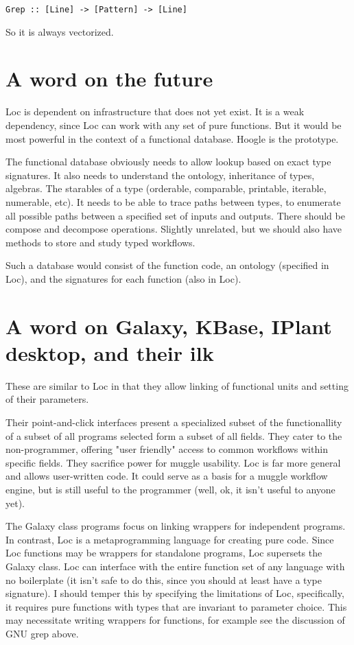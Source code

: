 \documentclass[12pt]{article}
\begin{document}
\begin{verbatim}
Grep :: [Line] -> [Pattern] -> [Line]
\end{verbatim}

So it is always vectorized.

\section{A word on the future}

Loc is dependent on infrastructure that does not yet exist. It is a weak
dependency, since Loc can work with any set of pure functions. But it would be
most powerful in the context of a functional database. Hoogle is the prototype.

The functional database obviously needs to allow lookup based on exact type
signatures. It also needs to understand the ontology, inheritance of types,
algebras. The starables of a type (orderable, comparable, printable, iterable,
numerable, etc). It needs to be able to trace paths between types, to enumerate
all possible paths between a specified set of inputs and outputs. There should
be compose and decompose operations. Slightly unrelated, but we should also
have methods to store and study typed workflows.

Such a database would consist of the function code, an ontology (specified in
Loc), and the signatures for each function (also in Loc).

\section{A word on Galaxy, KBase, IPlant desktop, and their ilk}

These are similar to Loc in that they allow linking of functional units and
setting of their parameters.

Their point-and-click interfaces present a specialized subset of the
functionallity of a subset of all programs selected form a subset of all
fields. They cater to the non-programmer, offering "user friendly" access to
common workflows within specific fields. They sacrifice power for muggle
usability. Loc is far more general and allows user-written code. It could serve
as a basis for a muggle workflow engine, but is still useful to the programmer
(well, ok, it isn't useful to anyone yet).

The Galaxy class programs focus on linking wrappers for independent programs.
In contrast, Loc is a metaprogramming language for creating pure code. Since
Loc functions may be wrappers for standalone programs, Loc supersets the Galaxy
class. Loc can interface with the entire function set of any language with no
boilerplate (it isn't safe to do this, since you should at least have a type
signature). I should temper this by specifying the limitations of Loc,
specifically, it requires pure functions with types that are invariant to
parameter choice. This may necessitate writing wrappers for functions, for
example see the discussion of GNU grep above.
\end{document}
